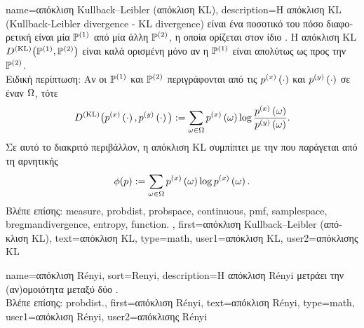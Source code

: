 {name={\foreignlanguage{greek}{απόκλιση} Kullback–Leibler (\foreignlanguage{greek}{απόκλιση} KL)}, 
 	description={\foreignlanguage{greek}{Η απόκλιση} 
		KL (Kullback-Leibler divergence - KL divergence) \foreignlanguage{greek}{είναι ένα ποσοτικό}  \foreignlanguage{greek}{του 
		πόσο διαφορετική είναι μία}  $\mathbb{P}^{(1)}$ \foreignlanguage{greek}{από μία άλλη}  
		$\mathbb{P}^{(2)}$, \foreignlanguage{greek}{η οποία ορίζεται στον ίδιο}  \cite{coverthomas}.
		\foreignlanguage{greek}{Η απόκλιση} KL $D^{(\rm KL)}\big( \mathbb{P}^{(1)},\mathbb{P}^{(2)} \big)$ \foreignlanguage{greek}{είναι καλά ορισμένη μόνο αν η
		$\mathbb{P}^{(1)}$ είναι απολύτως}  \foreignlanguage{greek}{ως προς την} $\mathbb{P}^{(2)}$.\\
		\foreignlanguage{greek}{Ειδική περίπτωση: Αν οι $\mathbb{P}^{(1)}$ και $\mathbb{P}^{(2)}$ περιγράφονται από τις}  
		$p^{(x)}\left(\cdot\right)$ \foreignlanguage{greek}{και $p^{(y)}\left(\cdot\right)$ σε έναν}  $\Omega$, 
		\foreignlanguage{greek}{τότε} 
		\[
			D^{(\rm KL)}\big( p^{(x)}\left(\cdot\right),p^{(y)}\left(\cdot\right) \big) := \sum_{\omega \in \Omega} 
			p^{(x)}\left(\omega\right) \log \frac{p^{(x)}\left(\omega\right)}{p^{(y)}\left(\omega\right)}.
		\]
		\foreignlanguage{greek}{Σε αυτό το διακριτό περιβάλλον, η απόκλιση} KL \foreignlanguage{greek}{συμπίπτει με την}  
		 \foreignlanguage{greek}{που παράγεται από τη}  \foreignlanguage{greek}{αρνητικής} 
		 \cite[\foreignlanguage{greek}{Ενότητα} 4.3]{CvxBubeck2015}
		\[
			\phi(p) := \sum_{\omega \in \Omega} 
			p^{(x)}\left(\omega\right) \log p^{(x)}\left(\omega\right).
		\]
		\foreignlanguage{greek}{Βλέπε επίσης:} \gls{measure}, \gls{probdist}, \gls{probspace}, \gls{continuous}, \gls{pmf}, \gls{samplespace},
		\gls{bregmandivergence}, \gls{entropy}, \gls{function}. },
 	first={\foreignlanguage{greek}{απόκλιση} Kullback–Leibler (\foreignlanguage{greek}{απόκλιση} KL)},
	text={\foreignlanguage{greek}{απόκλιση} KL},
	type=math,
	user1={\foreignlanguage{greek}{απόκλιση} KL}, %
  	user2={\foreignlanguage{greek}{απόκλισης} KL} %
}

{name={\foreignlanguage{greek}{απόκλιση} R\'enyi}, 
	sort={Renyi},
	description={\foreignlanguage{greek}{Η απόκλιση} R\'enyi 
		\foreignlanguage{greek}{μετράει την (αν)ομοιότητα μεταξύ δύο}  \cite{RenyiInfo95}.
		\\
		\foreignlanguage{greek}{Βλέπε επίσης:} \gls{probdist}.}, 
	first={\foreignlanguage{greek}{απόκλιση} R\'enyi},
	text={\foreignlanguage{greek}{απόκλιση} R\'enyi},
	type=math,
	user1={\foreignlanguage{greek}{απόκλιση} R\'enyi}, %
	user2={\foreignlanguage{greek}{απόκλισης} R\'enyi} %
}

